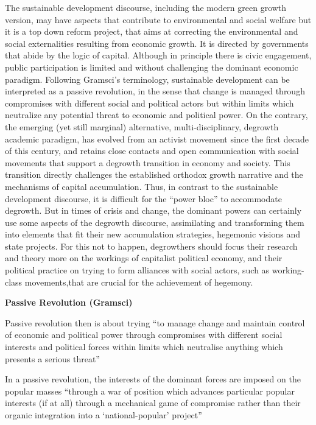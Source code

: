 \documentclass[
]{book}
\begin{document}
The sustainable development discourse, including the modern green growth version, may have aspects that contribute to environmental and social welfare but it is a top down reform project, that aims at correcting the environmental and social externalities resulting from economic growth. It is directed by governments that abide by the logic of capital. Although in principle there is civic engagement, public participation is limited and without challenging the dominant economic paradigm. Following Gramsci's terminology, sustainable development can be interpreted as a passive revolution, in the sense that change is managed through compromises with different social and political actors but within limits which neutralize any potential threat to economic and political power. On the contrary, the emerging (yet still marginal) alternative, multi-disciplinary, degrowth academic paradigm, has evolved from an activist movement since the first decade of this century, and retains close contacts and open communication with social movements that support a degrowth transition in economy and society. This transition directly challenges the established orthodox growth narrative and the mechanisms of capital accumulation. Thus, in contrast to the sustainable development discourse, it is difficult for the ``power bloc'' to accommodate degrowth. But in times of crisis and change, the dominant powers can certainly use some aspects of the degrowth discourse, assimilating and transforming them into elements that fit their new accumulation strategies, hegemonic visions and state projects. For this not to happen, degrowthers should focus their research and theory more on the workings of capitalist political economy, and their political practice on trying to form alliances with social actors, such as working-class movements,that are crucial for the achievement of hegemony.

\textbf{Passive Revolution (Gramsci)}

Passive revolution then is about trying ``to manage change
and maintain control of economic and political power through compromises with different social interests and
political forces within limits which neutralise anything which presents a serious threat''

In
a passive revolution, the interests of the dominant forces are imposed on the popular masses ``through a war of
position which advances particular popular interests (if at all) through a mechanical game of compromise rather
than their organic integration into a `national-popular' project''
\end{document}
